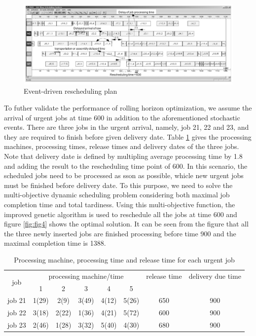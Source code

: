 \begin{figure}[h!]
	\begin{center}
		\includegraphics[width=1\linewidth]{sections/figure3.jpg}
		\caption{Event-driven rescheduling plan}
		\label{fig:fig3}
	\end{center}
\end{figure}


To futher validate the performance of rolling horizon optimization, we assume the arrival of urgent jobs at time 600 in addition to the aforementioned stochastic events.
There are three jobs in the urgent arrival, namely, job 21, 22 and 23, and they are required to finish before given delivery date.
Table \ref{tab:tab1} gives the processing machines, processing times, release times and delivery dates of the three jobs.
Note that delivery date is defined by multipling average processing time by 1.8 and adding the result to the rescheduling time point of 600.
In this scenario, the scheduled jobs need to be processed as sson as possible, whicle new urgent jobs must be finished before delivery date.
To this purpose, we need to solve the multi-objective dynamic scheduling problem considering both maximal job completion time and total tardiness. 
Using this multi-objective function, the improved genetic algorithm is used to reschedule all the jobs at time 600 and figure \ref{fig:fig4} shows the optimal solution.
It can be seen from the figure that all the three newly inserted jobs are finished processing before time 900 and the maximal completion time is 1388.


\begin{table}[h!]
	\begin{center}
		\caption{Processing machine, processing time and release time for each urgent job}
		\label{tab:tab1}
		\begin{tabular}{cccccccc}
			\hline
			\multirow{2}{*}{job} & \multicolumn{5}{c}{processing machine/time} & release time & delivery due time \\
			\cline{2-6}
			& 1 & 2 & 3 & 4 & 5 & & \\
			\hline 
			job 21 & 1(29) & 2(9) & 3(49) & 4(12) & 5(26) & 650 & 900\\
			job 22 & 3(18) & 2(22) & 1(36) & 4(21) & 5(72) & 600 & 900 \\
			job 23 & 2(46) & 1(28) & 3(32) & 5(40) & 4(30) & 680 & 900 \\
			\hline
		\end{tabular}
	\end{center}
\end{table}




